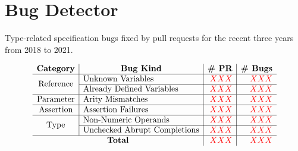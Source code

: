 \section{Bug Detector}\label{sec:checker}

\begin{table}
  \centering
  \caption{Type-related specification bugs fixed by pull requests for the recent
  three years from 2018 to 2021.}
  \label{table:pr-bugs}
  \vspace*{-1.5em}
  \[
    \begin{array}{c|l|r|r}
      \multicolumn{1}{c}{\textbf{Category}} &
      \multicolumn{1}{|c}{\textbf{Bug Kind}} &
      \multicolumn{1}{|c}{\textbf{\# PR}} &
      \multicolumn{1}{|c}{\textbf{\# Bugs}}\\
      \hline

      \multirow{2}{*}{\text{Reference}}
      & \text{Unknown Variables} & \inred{XXX} & \inred{XXX}\\\cline{2-4}
      & \text{Already Defined Variables} & \inred{XXX} & \inred{XXX}\\\hline

      \multirow{1}{*}{\text{Parameter}}
      & \text{Arity Mismatches} & \inred{XXX} & \inred{XXX}\\\hline

      \multirow{1}{*}{\text{Assertion}}
      & \text{Assertion Failures} & \inred{XXX} & \inred{XXX}\\\hline

      \multirow{2}{*}{\text{Type}}
      & \text{Non-Numeric Operands} & \inred{XXX} & \inred{XXX}\\\cline{2-4}
      & \text{Unchecked Abrupt Completions} & \inred{XXX} & \inred{XXX}\\\hline

      \multicolumn{2}{c|}{\textbf{Total}} & \inred{XXX} & \inred{XXX}\\

    \end{array}
  \]
  \vspace*{-1.5em}
\end{table}


